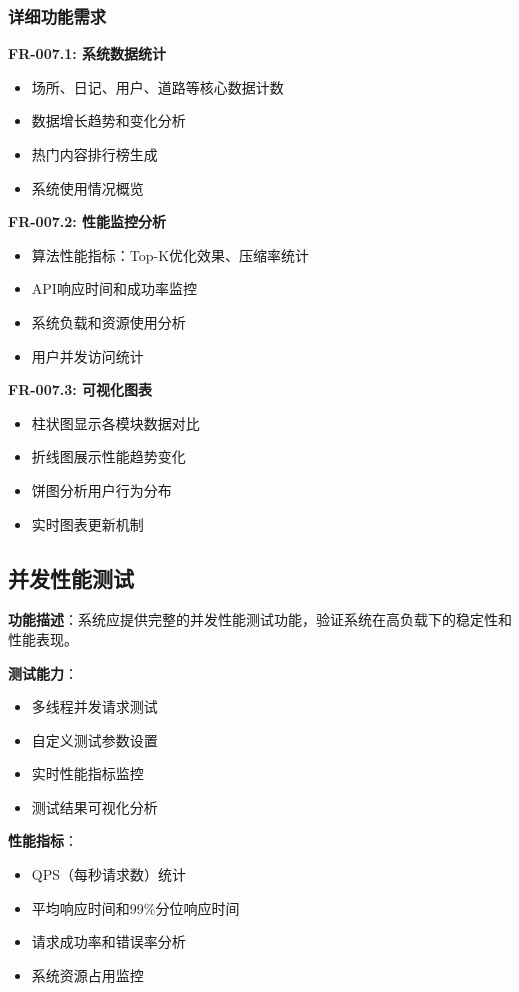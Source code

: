 \documentclass[12pt,a4paper]{article}
\begin{document}
\subsubsection{详细功能需求}

\textbf{FR-007.1: 系统数据统计}
\begin{itemize}
    \item 场所、日记、用户、道路等核心数据计数
    \item 数据增长趋势和变化分析
    \item 热门内容排行榜生成
    \item 系统使用情况概览
\end{itemize}

\textbf{FR-007.2: 性能监控分析}
\begin{itemize}
    \item 算法性能指标：Top-K优化效果、压缩率统计
    \item API响应时间和成功率监控
    \item 系统负载和资源使用分析
    \item 用户并发访问统计
\end{itemize}

\textbf{FR-007.3: 可视化图表}
\begin{itemize}
    \item 柱状图显示各模块数据对比
    \item 折线图展示性能趋势变化
    \item 饼图分析用户行为分布
    \item 实时图表更新机制
\end{itemize}

\subsection{并发性能测试}

\begin{reqbox}[title={FR-008: 并发性能测试}]
\textbf{功能描述}：系统应提供完整的并发性能测试功能，验证系统在高负载下的稳定性和性能表现。

\textbf{测试能力}：
\begin{itemize}[nosep]
    \item 多线程并发请求测试
    \item 自定义测试参数设置
    \item 实时性能指标监控
    \item 测试结果可视化分析
\end{itemize}

\textbf{性能指标}：
\begin{itemize}[nosep]
    \item QPS（每秒请求数）统计
    \item 平均响应时间和99\%分位响应时间
    \item 请求成功率和错误率分析
    \item 系统资源占用监控
\end{itemize}
\end{reqbox}
\end{document}
